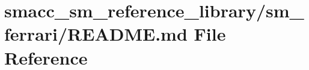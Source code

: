 \hypertarget{smacc__sm__reference__library_2sm__ferrari_2README_8md}{}\section{smacc\+\_\+sm\+\_\+reference\+\_\+library/sm\+\_\+ferrari/\+R\+E\+A\+D\+ME.md File Reference}
\label{smacc__sm__reference__library_2sm__ferrari_2README_8md}
